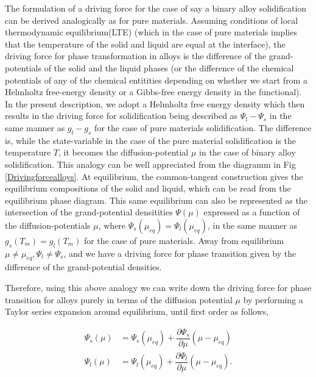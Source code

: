\documentclass[english]{iambook}
\begin{document}
  The formulation of a driving force for the case of say a binary alloy
  solidification can be derived analogically as for pure materials.
  Assuming conditions of local thermodynamic equilibrium(LTE) (which in the
  case of pure materials implies that the temperature of the solid and 
  liquid are equal at the interface), the driving force for phase
  transformation in alloys is the difference of the grand-potentials
  of the solid and the liquid phases (or the difference of the chemical
  potentials of any of the chemical entitities depending on whether we
  start from a Helmholtz free-energy density or a Gibbs-free energy 
  density in the functional). In the present description, we adopt a 
  Helmholtz free energy density which then results in the driving 
  force for solidification being described as $\Psi_l-\Psi_s$ in the same
  manner as $g_l-g_s$ for the case of pure materials solidification.
  The difference is, while the state-variable in the case of the pure
  material solidification is the temperature $T$, it becomes the 
  diffusion-potential $\mu$ in the case of binary alloy solidification.
  This analogy can be well appreciated from the diagramm in Fig \ref{Drivingforcealloys}.
  At equilibrium, the common-tangent construction gives the equilibrium
  compositions of the solid and liquid, which can be read from the 
  equilibrium phase diagram. This same equilibrium can also be represented
  as the intersection of the grand-potential densitities $\Psi\left(\mu\right)$ 
  expressed as a function of the diffusion-potentials $\mu$, where $\Psi_s\left(\mu_{eq}\right)
  =\Psi_l\left(\mu_{eq}\right)$, in the same manner as $g_s(T_m)= g_l(T_m)$ for
  the case of pure materials. Away from equilibrium  $\mu\neq\mu_{eq}, \Psi_l\neq \Psi_s$,
  and we have a driving force for phase transition given by the difference of the 
  grand-potential densities.
  
  Therefore, using this above analogy we can write down the driving force
  for phase transition for alloys purely in terms of the diffusion potential 
  $\mu$ by performing a Taylor series expansion around equilibrium, until first order as follows, 
  
  \begin{align}
  \Psi_s\left(\mu\right) &= \Psi_s\left(\mu_{eq}\right) + \dfrac{\partial \Psi_s}{\partial \mu}\left(\mu-\mu_{eq}\right)\\
  \Psi_l\left(\mu\right) &= \Psi_l\left(\mu_{eq}\right) + \dfrac{\partial \Psi_l}{\partial \mu}\left(\mu-\mu_{eq}\right).
  \end{align}
  
\end{document}
